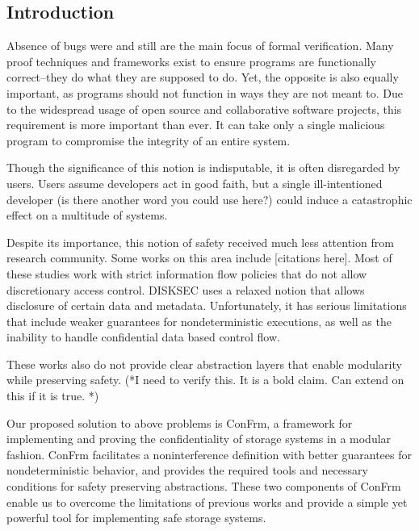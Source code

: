 \subsection*{Introduction}

Absence of bugs were and still are the main focus of formal verification. Many proof techniques and frameworks exist to ensure programs are functionally correct–they do what they are supposed to do. Yet, the opposite is also equally important, as programs should not function in ways they are not meant to. Due to the widespread usage of open source and collaborative software projects, this requirement is more important than ever. It can take only a single malicious program to compromise the integrity of an entire system. 

Though the significance of this notion is indisputable, it is often disregarded by users. Users assume developers act in good faith, but a single ill-intentioned developer {\color{red}(is there another word you could use here?)} could induce a catastrophic effect on a multitude of systems.


Despite its importance, this notion of safety received much less attention from research community. Some works on this area include [citations here]. Most of these studies work with strict information flow policies that do not allow discretionary access control. DISKSEC uses a relaxed notion that allows disclosure of certain data and metadata. Unfortunately, it has serious limitations that include weaker guarantees for nondeterministic executions, as well as the inability to handle confidential data based control flow. 

These works also do not provide clear abstraction layers that enable modularity while preserving safety. (*I need to verify this. It is a bold claim. Can extend on this if it is true. *) 

Our proposed solution to above problems is ConFrm, a framework for implementing and proving the confidentiality of storage systems in a modular fashion. ConFrm facilitates a noninterference definition with better guarantees for nondeterministic behavior, and provides the required tools and necessary conditions for safety preserving abstractions. These two components of ConFrm enable us to overcome the limitations of previous works and provide a simple yet powerful tool for implementing safe storage systems. 

